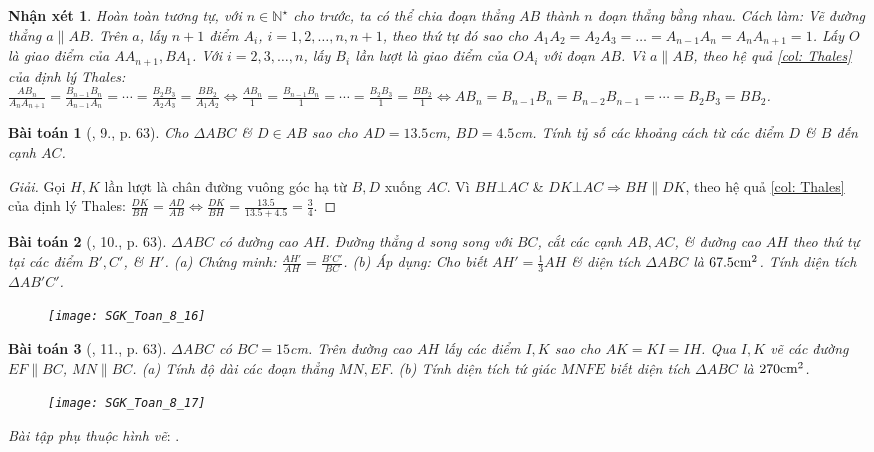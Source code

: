 \documentclass{article}
\newtheorem{baitoan}{Bài toán}
\newtheorem{nhanxet}{Nhận xét}
\begin{document}
\begin{nhanxet}
	Hoàn toàn tương tự, với $n\in\mathbb{N}^\star$ cho trước, ta có thể chia đoạn thẳng $AB$ thành $n$ đoạn thẳng bằng nhau. Cách làm: Vẽ đường thẳng $a\parallel AB$. Trên $a$, lấy $n+1$ điểm $A_i$, $i = 1,2,\ldots,n,n+1$, theo thứ tự đó sao cho $A_1A_2 = A_2A_3 = \ldots = A_{n-1}A_n = A_nA_{n+1} = 1$. Lấy $O$ là giao điểm của $AA_{n+1},BA_1$. Với $i = 2,3,\ldots,n$, lấy $B_i$ lần lượt là giao điểm của $OA_i$ với đoạn $AB$. Vì $a\parallel AB$, theo hệ quả \ref{col: Thales} của định lý Thales: $\frac{AB_n}{A_nA_{n+1}} = \frac{B_{n-1}B_n}{A_{n-1}A_n} = \cdots = \frac{B_2B_3}{A_2A_3} = \frac{BB_2}{A_1A_2}\Leftrightarrow\frac{AB_n}{1} = \frac{B_{n-1}B_n}{1} = \cdots = \frac{B_2B_3}{1} = \frac{BB_2}{1}\Leftrightarrow AB_n = B_{n-1}B_n = B_{n-2}B_{n-1} = \cdots = B_2B_3 = BB_2$.
\end{nhanxet}

\begin{baitoan}[\cite{SGK_Toan_8_tap_2}, 9., p. 63]
	Cho $\Delta ABC$ \& $D\in AB$ sao cho $AD = 13.5$\emph{cm}, $BD = 4.5$\emph{cm}. Tính tỷ số các khoảng cách từ các điểm $D$ \& $B$ đến cạnh $AC$.
\end{baitoan}

\begin{proof}[Giải]
	Gọi $H,K$ lần lượt là chân đường vuông góc hạ từ $B,D$ xuống $AC$. Vì $BH\bot AC$ \& $DK\bot AC\Rightarrow BH\parallel DK$, theo hệ quả \ref{col: Thales} của định lý Thales: $\frac{DK}{BH} = \frac{AD}{AB}\Leftrightarrow\frac{DK}{BH} = \frac{13.5}{13.5 + 4.5} = \frac{3}{4}$.
\end{proof}

\begin{baitoan}[\cite{SGK_Toan_8_tap_2}, 10., p. 63]
	$\Delta ABC$ có đường cao $AH$. Đường thẳng $d$ song song với $BC$, cắt các cạnh $AB,AC$, \& đường cao $AH$ theo thứ tự tại các điểm $B',C'$, \& $H'$. (a) Chứng minh: $\frac{AH'}{AH} = \frac{B'C'}{BC}$. (b) Áp dụng: Cho biết $AH' = \frac{1}{3}AH$ \& diện tích $\Delta ABC$ là $67.5{\rm cm}^2$. Tính diện tích $\Delta AB'C'$.
	\begin{figure}[H]
		\centering
		\texttt{[image: SGK\_Toan\_8\_16]}
	\end{figure}
\end{baitoan}

\begin{baitoan}[\cite{SGK_Toan_8_tap_2}, 11., p. 63]
	$\Delta ABC$ có $BC = 15$\emph{cm}. Trên đường cao $AH$ lấy các điểm $I,K$ sao cho $AK = KI = IH$. Qua $I,K$ vẽ các đường $EF\parallel BC$, $MN\parallel BC$. (a) Tính độ dài các đoạn thẳng $MN,EF$. (b) Tính diện tích tứ giác $MNFE$ biết diện tích $\Delta ABC$ là $270{\rm cm}^2$.
	\begin{figure}[H]
		\centering
		\texttt{[image: SGK\_Toan\_8\_17]}
	\end{figure}
\end{baitoan}
\noindent\textit{Bài tập phụ thuộc hình vẽ}: \cite[12.--13., p. 64]{SGK_Toan_8_tap_2}.
\end{document}
